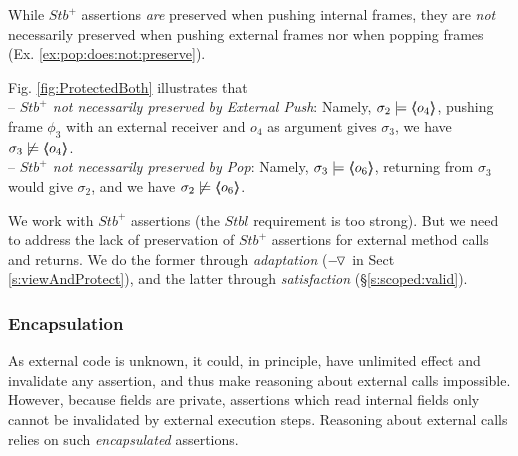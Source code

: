 While $Stb^+$ assertions \emph{are} preserved  when pushing  internal frames,   they  are \emph{not} necessarily preserved when pushing  external frames  
nor when popping frames   (\cf Ex. \ref{ex:pop:does:not:preserve}). 

{ 
\begin{example}%
\label{push:does:not:preserve}
Fig. \ref{fig:ProtectedBoth} illustrates that \\ 
-- \textit{$Stb^+$  not necessarily preserved by External Push}: 
Namely, $\sigma_2 \models \langle\!\!\langle o_4 \rangle\!\!\rangle$,   pushing   frame $\phi_3$ with an external receiver 
 and $o_4$ as argument gives $\sigma_3$,  we have $\sigma_3 \not\models \langle\!\!\langle o_4 \rangle\!\!\rangle$.
% 
\\
\label{ex:pop:does:not:preserve}
-- \textit{$Stb^+$  not necessarily preserved by Pop}:  %
Namely,  $\sigma_3 \models \langle\!\!\langle o_6 \rangle\!\!\rangle$, returning from $\sigma_3$ would give  $\sigma_2$, and  we have  $\sigma_2 \not\models \langle\!\!\langle o_6 \rangle\!\!\rangle$.
\end{example}
}

{We work with  $Stb^+$  assertions   (the  $Stbl$ requirement is too strong). 
But  we need to address the lack of preservation of $Stb^+$ assertions  {for external method calls and returns}.
We do the former   through    \emph{adaptation}   ($ {-\!\,\!{\triangledown}} {}$ in Sect \ref{s:viewAndProtect}), and the latter through  
\emph{\strong satisfaction} (\S \ref{s:scoped:valid}).
  }
  

\subsubsection{\textbf{Encapsulation}} %
As external code is unknown, it could, in principle, have unlimited effect and  invalidate any assertion, and thus make  reasoning about  external calls impossible.
However, because fields are private, assertions which  read internal fields only  cannot be invalidated by external execution steps.
Reasoning about external calls relies on such   \emph{encapsulated} assertions.
 

